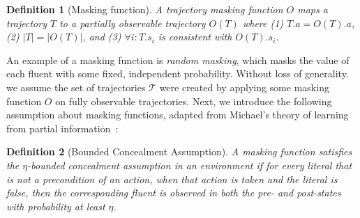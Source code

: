 \documentclass[letterpaper]{article} %
\newcommand{\roni}[1]{ }
\newtheorem{definition}{Definition}
\begin{document}


\begin{definition}[Masking function]
A trajectory {masking function} $O$ maps a trajectory $T$ to a partially observable trajectory $O(T)$ where 
(1) $T.a=O(T).a$, 
(2) $|T|=|O(T)|$,
and (3) $\forall i: T.s_i$ is consistent with $O(T).s_i$. 
\end{definition}
An example of a masking function is \emph{random masking}, which masks the value of each fluent with some fixed, independent probability. 
Without loss of generality. we assume the set of trajectories $\mathcal{T}$ were created by applying some masking function $O$ on fully observable trajectories. 
Next, we introduce the following assumption about masking functions, adapted from Michael's theory of learning from partial information~\cite{michael2010partialObservability}:
\begin{definition}[Bounded Concealment Assumption]
A masking function satisfies the {\em $\eta$-bounded concealment assumption} in an environment if for every literal that is not a precondition of an action, when that action is taken and the literal is false, then the corresponding fluent is observed in both the pre- and post-states with probability at least $\eta$. 

\end{definition}
\end{document}
